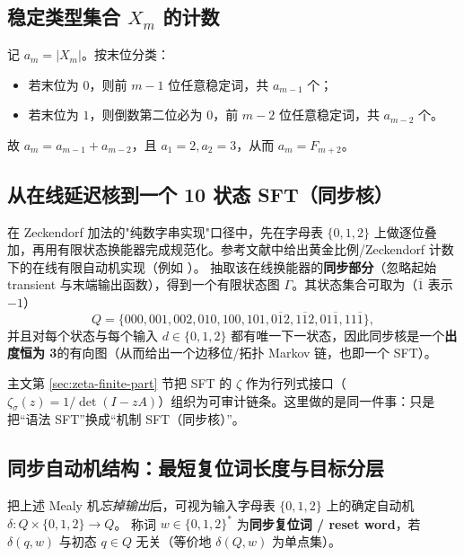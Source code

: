 \subsection{稳定类型集合 \texorpdfstring{$X_m$}{X\_m} 的计数}
\label{subsec:sync-kernel-counting}
记 $a_m=|X_m|$。按末位分类：
\begin{itemize}
  \item 若末位为 $0$，则前 $m-1$ 位任意稳定词，共 $a_{m-1}$ 个；
  \item 若末位为 $1$，则倒数第二位必为 $0$，前 $m-2$ 位任意稳定词，共 $a_{m-2}$ 个。
\end{itemize}
故 $a_m=a_{m-1}+a_{m-2}$，且 $a_1=2,a_2=3$，从而 $a_m=F_{m+2}$。

\subsection{从在线延迟核到一个 10 状态 SFT（同步核）}
在 Zeckendorf 加法的"纯数字串实现"口径中，先在字母表 $\{0,1,2\}$ 上做逐位叠加，再用有限状态换能器完成规范化。参考文献中给出黄金比例/Zeckendorf 计数下的在线有限自动机实现（例如 \cite{Frougny1999OnlineAddition}）。
抽取该在线换能器的\textbf{同步部分}（忽略起始 transient 与末端输出函数），得到一个有限状态图 $\Gamma$。其状态集合可取为（$\overline{1}$ 表示 $-1$）
\[
Q=\{000,001,002,010,100,101,0\overline{1}2,1\overline{1}2,01\overline{1},11\overline{1}\},
\]
并且对每个状态与每个输入 $d\in\{0,1,2\}$ 都有唯一下一状态，因此同步核是一个\textbf{出度恒为 3}的有向图（从而给出一个边移位/拓扑 Markov 链，也即一个 SFT）。



\begin{remark}
主文第 \ref{sec:zeta-finite-part} 节把 SFT 的 \(\zeta\) 作为行列式接口（\(\zeta_\sigma(z)=1/\det(I-zA)\)）组织为可审计链条。这里做的是同一件事：只是把“语法 SFT”换成“机制 SFT（同步核）”。
\end{remark}

\subsection{同步自动机结构：最短复位词长度与目标分层}\label{app:sync-kernel-reset-automaton}
把上述 Mealy 机\emph{忘掉输出}后，可视为输入字母表 $\{0,1,2\}$ 上的确定自动机
\(
\delta:Q\times\{0,1,2\}\to Q
\)。
称词 $w\in\{0,1,2\}^\ast$ 为\textbf{同步复位词 / reset word}，若 $\delta(q,w)$ 与初态 $q\in Q$ 无关（等价地 $\delta(Q,w)$ 为单点集）。

